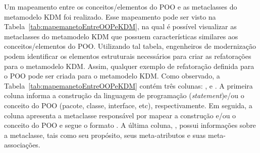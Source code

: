 Um mapeamento entre os conceitos/elementos do POO e as metaclasses do metamodelo KDM foi realizado. Esse mapeamento pode ser visto na Tabela~\ref{tab:mapemanetoEntreOOPeKDM}, na qual é possível visualizar as metaclasses do metamodelo KDM que possuem características similares aos conceitos/elementos do POO. Utilizando tal tabela, engenheiros de modernização podem identificar os elementos estruturais necessários para criar as refatorações para o metamodelo KDM. Assim, qualquer exemplo de refatoração definida para o POO pode ser criada para o metamodelo KDM. Como observado, a Tabela~\ref{tab:mapemanetoEntreOOPeKDM} contém três colunas: ,  e . A primeira coluna informa a construção da linguagem de programação (\textit{statement})e/ou o conceito do POO (pacote, classe, interface, etc), respectivamente. Em seguida, a coluna  apresenta a metaclasse responsável por mapear a construção e/ou o conceito do POO e segue o formato . A última coluna, , possui informações sobre a metaclasse, tais como seu propósito, seus meta-atributos e suas meta-associações.
